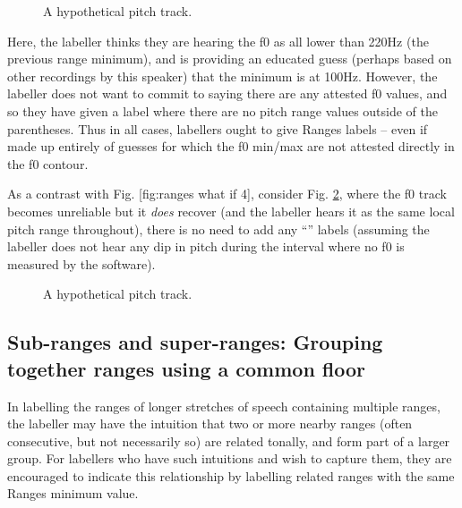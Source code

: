 \documentclass[11pt, twoside]{memoir}
\def\textlabel#1{{\relsize{-.5}\fontspec[Mapping=tex-text]{Roboto Mono}{#1}}}
\begin{document}
\begin{figure}[H]
\centering
%

%
\caption{A hypothetical pitch track.%
\label{fig:ranges-what-if4 Ranges Adv}%
}
\end{figure}

Here, the labeller thinks they are hearing the f0 as all lower than 220Hz (the previous range minimum), and is providing an educated guess (perhaps based on other recordings by this speaker) that the minimum is at 100Hz. However, the labeller does not want to commit to saying there are any attested f0 values, and so they have given a label where there are no pitch range values outside of the parentheses. Thus in all cases, labellers ought to give Ranges labels – even if made up entirely of guesses for which the f0 min\slash max are not attested directly in the f0 contour.

As a contrast with Fig. [fig:ranges what if 4], consider Fig. \ref{fig:ranges-what-if5 Ranges Adv}, where the f0 track becomes unreliable but it \emph{does} recover (and the labeller hears it as the same local pitch range throughout), there is no need to add any “\textlabel{:na}” labels (assuming the labeller does not hear any dip in pitch during the interval where no f0 is measured by the software).

\begin{figure}[H]
\centering
%

%
\caption{A hypothetical pitch track.%
\label{fig:ranges-what-if5 Ranges Adv}%
}
\end{figure}

\subsection{Sub-ranges and super-ranges: Grouping together ranges using a common floor}\label{sec:sub-ranges-and-super-ranges-grouping-together-ranges-using-a-common-floor}

In labelling the ranges of longer stretches of speech containing multiple ranges, the labeller may have the intuition that two or more nearby ranges (often consecutive, but not necessarily so) are related tonally, and form part of a larger group. For labellers who have such intuitions and wish to capture them, they are encouraged to indicate this relationship by labelling related ranges with the same Ranges minimum value.
\end{document}
